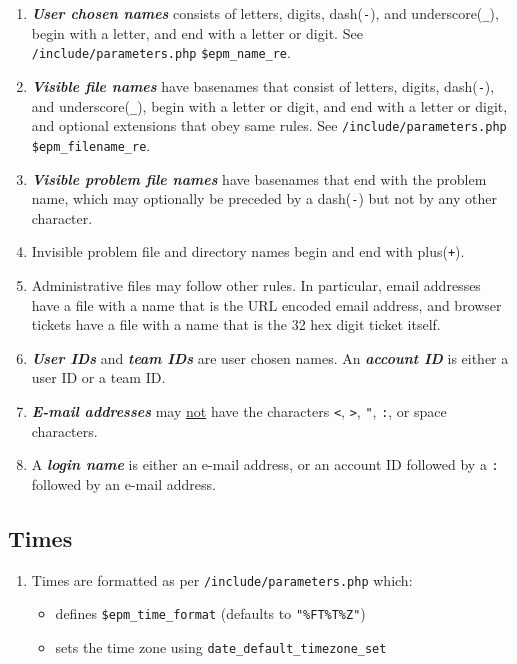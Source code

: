 \documentclass[12pt]{article}
\newcommand{\key}[1]{{\bf \em #1}}
\newcommand{\EOL}{\penalty \exhyphenpenalty}
\begin{document}
\begin{enumerate}
\item \key{User chosen names}\label{USER-CHOSEN-NAME}
consists of letters, digits,
dash({\tt -}), and underscore({\tt \_}), begin with a letter,
and end with a letter or digit.
See {\tt /include/parameters.php} {\tt \$epm\_name\_re}.
\item \key{Visible file names} have basenames that
consist of letters, digits, dash({\tt -}), and
underscore({\tt \_}), begin with a letter or digit, and end
with a letter or digit, and optional extensions that obey
same rules.  See {\tt /include/parameters.php} {\tt \$epm\_filename\_re}.
\item \key{Visible problem file names} have basenames that end with the
      problem name, which may optionally be preceded by a dash({\tt -}) but
      not by any other character.
\item Invisible problem
      file and directory names begin and end with plus({\tt +}).
\item Administrative files may follow other rules.  In particular,
      email addresses have a file with a name that is the URL encoded email
      address, and browser tickets have a file with a name that is the
      32 hex digit ticket itself.
\item \key{User IDs} and \key{team IDs}\label{AIDS} are user chosen names.
      An \key{account ID} is either a user ID or a team ID.
\item \key{E-mail addresses} may \underline{not} have the
      characters {\tt <}, {\tt >}, {\tt "}, {\tt :}, or space
      characters.
\item A \key{login name} is either an e-mail address, or an
      account ID followed by a {\tt :} followed by an e-mail address.
\end{enumerate}

\subsection{Times}

\begin{enumerate}
\item Times are formatted as per {\tt /include/parameters.php}
     which:
     \begin{itemize}
     \item defines {\tt \$epm\_time\_\EOL format}
           (defaults to {\tt "\%FT\%T\%Z"})
     \item sets the time zone using
           {\tt date\_default\_\EOL timezone\_\EOL set}
     \end{itemize}

\end{enumerate}
\end{document}
